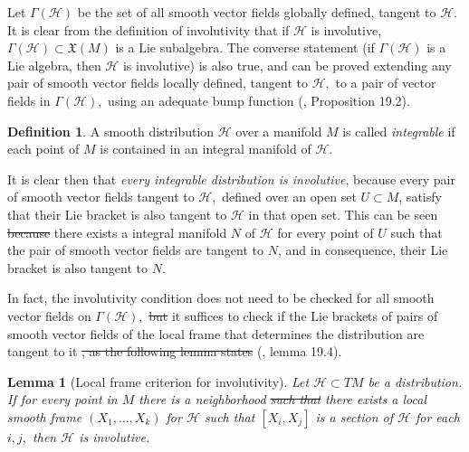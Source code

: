 \documentclass[12pt, letterpaper, reqno]{amsart}
\theoremstyle{definition}
\newtheorem{df}{Definition}
\theoremstyle{plain}
\newtheorem{lm}{Lemma}
\theoremstyle{remark}
\providecommand{\DIFadd}[1]{{\protect\color{blue}\uwave{#1}}} %
\providecommand{\DIFdel}[1]{{\protect\color{red}\sout{#1}}}                      %
\providecommand{\DIFaddbegin}{} %
\providecommand{\DIFaddend}{} %
\providecommand{\DIFdelbegin}{} %
\providecommand{\DIFdelend}{} %
\newcommand{\DIFscaledelfig}{0.5}
\newlength{\DIFdelgraphicswidth} %
\newlength{\DIFdelgraphicsheight} %
\newcommand{\DIFaddincludegraphics}[2][]{{\color{blue}\fbox{\DIFOincludegraphics[#1]{#2}}}} %
\newcommand{\DIFdelincludegraphics}[2][]{%
\sbox{\DIFdelgraphicsbox}{\DIFOincludegraphics[#1]{#2}}%
\settoboxwidth{\DIFdelgraphicswidth}{\DIFdelgraphicsbox} %
\settoboxtotalheight{\DIFdelgraphicsheight}{\DIFdelgraphicsbox} %
\scalebox{\DIFscaledelfig}{%
\parbox[b]{\DIFdelgraphicswidth}{\usebox{\DIFdelgraphicsbox}\\[-\baselineskip] \rule{\DIFdelgraphicswidth}{0em}}\llap{\resizebox{\DIFdelgraphicswidth}{\DIFdelgraphicsheight}{%
\setlength{\unitlength}{\DIFdelgraphicswidth}%
\begin{picture}(1,1)%
\thicklines\linethickness{2pt} %
{\color[rgb]{1,0,0}\put(0,0){\framebox(1,1){}}}%
{\color[rgb]{1,0,0}\put(0,0){\line( 1,1){1}}}%
{\color[rgb]{1,0,0}\put(0,1){\line(1,-1){1}}}%
\end{picture}%
}\hspace*{3pt}}} %
} %
\DeclareRobustCommand{\DIFaddbegin}{\DIFOaddbegin \let\includegraphics\DIFaddincludegraphics} %
\DeclareRobustCommand{\DIFaddend}{\DIFOaddend \let\includegraphics\DIFOincludegraphics} %
\DeclareRobustCommand{\DIFdelbegin}{\DIFOdelbegin \let\includegraphics\DIFdelincludegraphics} %
\DeclareRobustCommand{\DIFdelend}{\DIFOaddend \let\includegraphics\DIFOincludegraphics} %
\begin{document}
Let $ \Gamma(\mathcal{H}) $ be the set of all smooth vector fields globally defined, tangent to $ \mathcal{H}. $ It is clear from the definition of involutivity that if $ \mathcal{H} $ is involutive, $ \Gamma (\mathcal{H})\subset \mathfrak{X}(M) $ is a Lie subalgebra. The converse statement (if $ \Gamma(\mathcal{H}) $ is a Lie algebra, then $ \mathcal{H} $ is involutive) is also true, and can be proved extending any pair of smooth vector fields locally defined, tangent to $ \mathcal{H} ,$ to a pair of vector fields in $ \Gamma( \mathcal{H}), $ using an adequate bump function (\cite{lee2003introduction}, Proposition 19.2). 

\begin{df}
	A smooth distribution $ \mathcal{H} $ over a manifold $ M $ is called \textit{integrable} if each point of $ M $ is contained in an integral manifold of $ \mathcal{H}. $  
\end{df}
It is clear then that \textit{every integrable distribution is involutive}, because every pair of smooth vector fields tangent to $ \mathcal{H}, $ defined over an open set $ U\subset M $, satisfy that their Lie bracket is also tangent to $ \mathcal{H} $ in that open set. This can be seen \DIFdelbegin \DIFdel{because }\DIFdelend \DIFaddbegin \DIFadd{noticing that }\DIFaddend there exists a integral manifold $ N $  of $ \mathcal{H} $ for every point of $ U $ such that the pair of smooth vector fields are tangent to $ N $, and in consequence, their Lie bracket is also tangent to $ N. $  

In fact, the involutivity condition does not need to be checked for all smooth vector fields on $ \Gamma( \mathcal{H}), $ \DIFdelbegin \DIFdel{but }\DIFdelend \DIFaddbegin \DIFadd{as }\DIFaddend it suffices to check if the Lie brackets of pairs of smooth vector fields of the local frame that determines the distribution are tangent to it \DIFdelbegin \DIFdel{, as the following lemma states }\DIFdelend (\cite{lee2003introduction}, lemma 19.4).

\begin{lm}[Local frame criterion for involutivity] 
	Let $ \mathcal{H}\subset TM $ be a distribution. If for every point in $ M $ there is a neighborhood \DIFdelbegin \DIFdel{such that }\DIFdelend \DIFaddbegin \DIFadd{where }\DIFaddend there exists a local smooth frame $ (X_1,\dots, X_k) $ for $ \mathcal{H} $ such that $ [X_i,X_j] $ is a section of $ \mathcal{H} $ for each $ i,j, $ then $ \mathcal{H} $ is involutive.
\end{lm}
\end{document}
